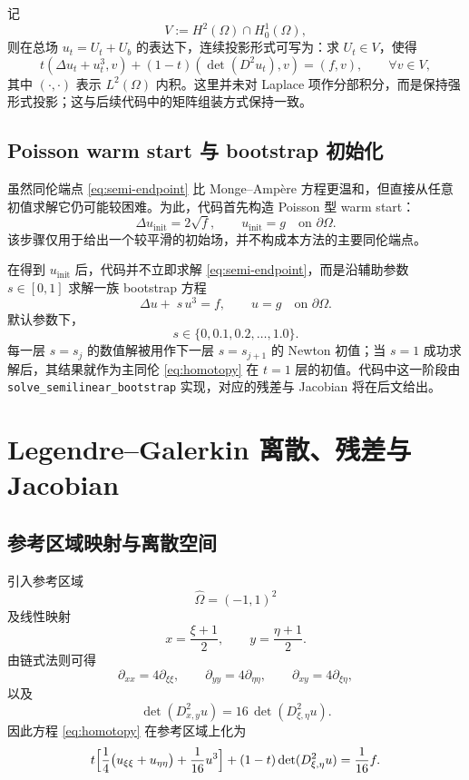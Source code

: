 \documentclass[11pt,a4paper]{article}
\begin{document}
记
\[
V:=H^2(\Omega)\cap H_0^1(\Omega),
\]
则在总场 $u_t=U_t+U_b$ 的表达下，连续投影形式可写为：求 $U_t\in V$，使得
\begin{equation}
t(\Delta u_t+u_t^3,v)+(1-t)(\det(D^2u_t),v)=(f,v),
\qquad \forall v\in V,
\label{eq:weak-cont}
\end{equation}
其中 $(\cdot,\cdot)$ 表示 $L^2(\Omega)$ 内积。这里并未对 Laplace 项作分部积分，而是保持强形式投影；这与后续代码中的矩阵组装方式保持一致。

\subsection{Poisson warm start 与 bootstrap 初始化}
虽然同伦端点 \eqref{eq:semi-endpoint} 比 Monge--Amp\`ere 方程更温和，但直接从任意初值求解它仍可能较困难。为此，代码首先构造 Poisson 型 warm start：
\begin{equation}
\Delta u_{\mathrm{init}} = 2\sqrt{f},
\qquad
u_{\mathrm{init}}=g \quad \text{on }\partial\Omega.
\label{eq:warmstart}
\end{equation}
该步骤仅用于给出一个较平滑的初始场，并不构成本方法的主要同伦端点。

在得到 $u_{\mathrm{init}}$ 后，代码并不立即求解 \eqref{eq:semi-endpoint}，而是沿辅助参数 $s\in[0,1]$ 求解一族 bootstrap 方程
\begin{equation}
\Delta u+\;s\,u^3=f,
\qquad
u=g \quad \text{on }\partial\Omega.
\label{eq:bootstrap}
\end{equation}
默认参数下，
\begin{equation}
s\in\{0,0.1,0.2,\dots,1.0\}.
\label{eq:s-seq}
\end{equation}
每一层 $s=s_j$ 的数值解被用作下一层 $s=s_{j+1}$ 的 Newton 初值；当 $s=1$ 成功求解后，其结果就作为主同伦 \eqref{eq:homotopy} 在 $t=1$ 层的初值。代码中这一阶段由 \texttt{solve\_semilinear\_bootstrap} 实现，对应的残差与 Jacobian 将在后文给出。

\section{Legendre--Galerkin 离散、残差与 Jacobian}
\subsection{参考区域映射与离散空间}
引入参考区域
\[
\widehat\Omega=(-1,1)^2
\]
及线性映射
\begin{equation}
x=\frac{\xi+1}{2},
\qquad
y=\frac{\eta+1}{2}.
\label{eq:map}
\end{equation}
由链式法则可得
\begin{equation}
\partial_{xx}=4\partial_{\xi\xi},
\qquad
\partial_{yy}=4\partial_{\eta\eta},
\qquad
\partial_{xy}=4\partial_{\xi\eta},
\label{eq:scaling}
\end{equation}
以及
\begin{equation}
\det(D^2_{x,y}u)=16\,\det(D^2_{\xi,\eta}u).
\label{eq:det-scale}
\end{equation}
因此方程 \eqref{eq:homotopy} 在参考区域上化为
\begin{equation}
t\Bigl[\frac14\bigl(u_{\xi\xi}+u_{\eta\eta}\bigr)+\frac1{16}u^3\Bigr]
+(1-t)\det(D^2_{\xi,\eta}u)
=\frac1{16}f.
\label{eq:ref}
\end{equation}
\end{document}

